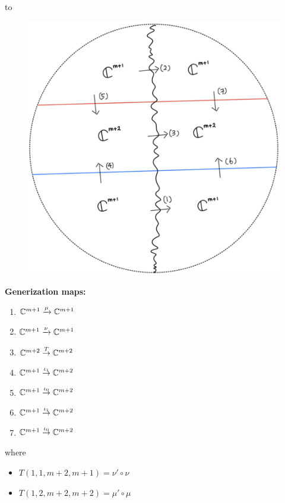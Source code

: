 to
\begin{figure}[H]
    \centering
    \includegraphics[scale = 0.45]{diagrams/lemma3/33.png} 
    \caption{}
    \label{fig:your-label}
\end{figure}
\textbf{Generization maps:}
\begin{enumerate}[label = (\arabic*)]
\item $\mathbb{C}^{m+1} \xrightarrow{\mu} \mathbb{C}^{m+1}$

\item $\mathbb{C}^{m+1} \xrightarrow{\nu} \mathbb{C}^{m+1}$

\item $\mathbb{C}^{m+2} \overset{T}{\rightarrow} \mathbb{C}^{m+2}$

\item $\mathbb{C}^{m+1} \overset{\iota_1}{\rightarrow} \mathbb{C}^{m+2}$

\item $\mathbb{C}^{m+1} \overset{\iota_0}{\rightarrow} \mathbb{C}^{m+2}$

\item $\mathbb{C}^{m+1} \overset{\iota_1}{\rightarrow} \mathbb{C}^{m+2}$

\item $\mathbb{C}^{m+1} \overset{\iota_0}{\rightarrow} \mathbb{C}^{m+2}$
\end{enumerate}
where 
\begin{itemize}
\item $T(1,1,m+2,m+1) = \nu' \circ \nu$
\item $T(1,2,m+2,m+2) = \mu' \circ \mu$
\end{itemize}

